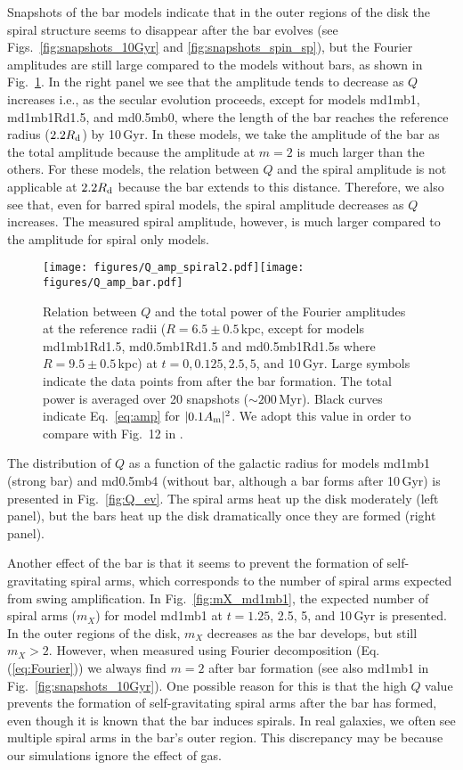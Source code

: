 Snapshots of the bar models indicate that in the outer regions of the disk the spiral structure 
seems to disappear after the bar evolves (see Figs.~\ref{fig:snapshots_10Gyr} and
  \ref{fig:snapshots_spin_sp}), but the Fourier amplitudes are still large
compared to the models without bars, as shown in Fig.~\ref{fig:Q_amp}.
In the right panel we see that
the amplitude tends to decrease as $Q$ increases i.e., as the secular evolution
proceeds, except for models md1mb1,
md1mb1Rd1.5, and md0.5mb0, where the length of the bar reaches the reference radius
($2.2R_{\rm d}$)
by 10\,Gyr. In these models, we take the amplitude of the bar as the total amplitude
because the amplitude at $m=2$ is much larger than the others. 
  For these models, the relation between $Q$ and the spiral amplitude is not applicable
  at $2.2R_{\rm d}$ because the bar extends to this distance.
  Therefore, we also see that, even for barred spiral models, the spiral amplitude decreases as 
  $Q$ increases. The measured spiral amplitude, however,
  is much larger compared to the amplitude for spiral only models.

\begin{figure*}
\texttt{[image: figures/Q\_amp\_spiral2.pdf]}\texttt{[image: figures/Q\_amp\_bar.pdf]}
\caption{Relation between $Q$ and the total power of the Fourier amplitudes at the reference radii ($R=6.5\pm0.5$\,kpc, except for models md1mb1Rd1.5, 
md0.5mb1Rd1.5 and md0.5mb1Rd1.5s where $R=9.5\pm0.5$\,kpc) at $t=0, 0.125, 2.5, 5$, and 10\,Gyr. 
Large symbols indicate the data points from after the bar formation.
The total power is averaged over 20 snapshots ($\sim 200$\,Myr).
Black curves indicate
Eq.~\ref{eq:amp} for $|0.1A_{\rm m}|^2$. We adopt this value in order to 
  compare with Fig.~12 in \citet{2011ApJ...730..109F}.
  \label{fig:Q_amp}}
  
\end{figure*}

The distribution of $Q$ as a function of the galactic radius for models md1mb1 (strong bar) and md0.5mb4 (without bar, although 
a bar forms after 10\,Gyr) is presented in Fig.~\ref{fig:Q_ev}. 
The spiral arms heat up the disk moderately (left panel), but the bars
heat up the disk dramatically once they are formed (right panel).

Another effect of the bar is that it seems to prevent the formation of self-gravitating 
spiral arms, which corresponds to the number of spiral arms expected from swing amplification.
In Fig.~\ref{fig:mX_md1mb1}, the expected number of spiral arms ($m_X$)
for model md1mb1 at $t=1.25$, 2.5, 5, and 10\,Gyr is presented.
In the outer regions of the disk, $m_{X}$ decreases as the bar develops,
but still $m_X>2$. 
However, 
when measured using Fourier decomposition (Eq. (\ref{eq:Fourier})) 
we always find $m=2$ after bar formation (see also md1mb1 in Fig.~\ref{fig:snapshots_10Gyr}).
One possible reason for this is that the high $Q$ value prevents the formation of
self-gravitating spiral arms after the bar has formed, even though 
it is known that the bar induces spirals. 
In real galaxies, we often see multiple spiral arms in the bar's outer region.
This discrepancy may be because our simulations ignore the effect of gas.
 

